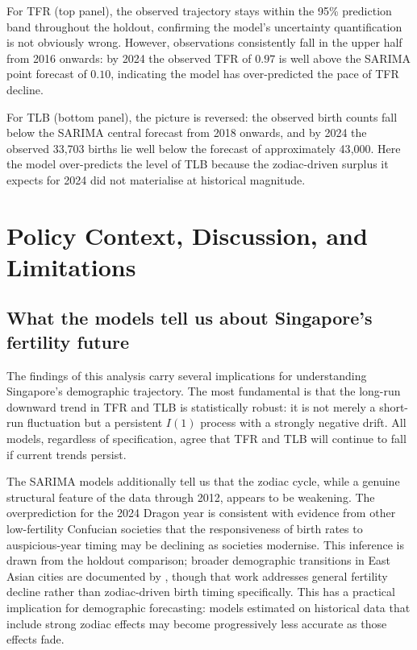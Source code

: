 \documentclass[12pt,a4paper]{article}
\begin{document}
For TFR (top panel), the observed trajectory stays within the 95\% prediction band
throughout the holdout, confirming the model's uncertainty quantification is not
obviously wrong. However, observations consistently fall in the upper half from 2016
onwards: by 2024 the observed TFR of $0.97$ is well above the SARIMA point forecast
of $0.10$, indicating the model has over-predicted the pace of TFR decline.

For TLB (bottom panel), the picture is reversed: the observed birth counts fall
below the SARIMA central forecast from 2018 onwards, and by 2024 the observed
33{,}703 births lie well below the forecast of approximately 43{,}000. Here the
model over-predicts the level of TLB because the zodiac-driven surplus it expects
for 2024 did not materialise at historical magnitude.

\section{Policy Context, Discussion, and Limitations}
\label{sec:policy}

\subsection{What the models tell us about Singapore's fertility future}

The findings of this analysis carry several implications for understanding Singapore's
demographic trajectory. The most fundamental is that the long-run downward trend in
TFR and TLB is statistically robust: it is not merely a short-run fluctuation but a
persistent $I(1)$ process with a strongly negative drift. All models, regardless of
specification, agree that TFR and TLB will continue to fall if current trends persist.

The SARIMA models additionally tell us that the zodiac cycle, while a genuine structural
feature of the data through 2012, appears to be weakening. The overprediction for the
2024 Dragon year is consistent with evidence from other low-fertility Confucian societies
that the responsiveness of birth rates to auspicious-year timing may be declining as
societies modernise. This inference is drawn from the holdout comparison; broader
demographic transitions in East Asian cities are documented by \citet{jones1990},
though that work addresses general fertility decline rather than zodiac-driven
birth timing specifically. This has a practical implication
for demographic forecasting: models estimated on historical data that include strong
zodiac effects may become progressively less accurate as those effects fade.
\end{document}

